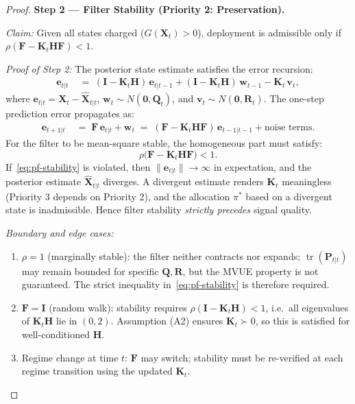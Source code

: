 \documentclass[12pt,openany]{book}
\numberwithin{equation}{chapter}
\theoremstyle{plain}
\theoremstyle{definition}
\theoremstyle{remark}
\DeclareMathOperator{\tr}{tr}
\def\mathcal#1{#1}%
\begin{document}
\begin{proof}
\medskip
\noindent\textbf{Step 2 — Filter Stability (Priority 2: Preservation).}

\noindent\textit{Claim:} Given all states charged
($G(\mathbf{X}_t) > 0$), deployment is admissible only if
$\rho(\mathbf{F} - \mathbf{K}_t\mathbf{H}\mathbf{F}) < 1$.

\noindent\textit{Proof of Step 2:}
The posterior state estimate satisfies the error recursion:
\begin{align}
  \mathbf{e}_{t|t}
  &\;=\; (\mathbf{I} - \mathbf{K}_t\mathbf{H})\,\mathbf{e}_{t|t-1}
         + (\mathbf{I} - \mathbf{K}_t\mathbf{H})\,\mathbf{w}_{t-1}
         - \mathbf{K}_t\,\mathbf{v}_t,
  \label{eq:pf-error-recursion}
\end{align}
where $\mathbf{e}_{t|t} = \mathbf{X}_t - \hat{\mathbf{X}}_{t|t}$,
$\mathbf{w}_t \sim \mathcal{N}(\mathbf{0}, \mathbf{Q}_t)$,
and $\mathbf{v}_t \sim \mathcal{N}(\mathbf{0}, \mathbf{R}_t)$.
The one-step prediction error propagates as:
\begin{align}
  \mathbf{e}_{t+1|t}
  &\;=\; \mathbf{F}\,\mathbf{e}_{t|t} + \mathbf{w}_t
  \;=\; (\mathbf{F} - \mathbf{K}_t\mathbf{H}\mathbf{F})\,
        \mathbf{e}_{t-1|t-1}
        + \text{noise terms}.
  \label{eq:pf-pred-error}
\end{align}
For the filter to be mean-square stable, the homogeneous part
must satisfy:
\begin{equation}
  \rho\!\bigl(\mathbf{F} - \mathbf{K}_t\mathbf{H}\mathbf{F}\bigr) < 1.
  \label{eq:pf-stability}
\end{equation}
If~\eqref{eq:pf-stability} is violated, then
$\|\mathbf{e}_{t|t}\| \to \infty$ in expectation, and the
posterior estimate $\hat{\mathbf{X}}_{t|t}$ diverges.  A
divergent estimate renders $\mathbf{K}_t$ meaningless (Priority
3 depends on Priority 2), and the allocation $\pi^*$ based on
a divergent state is inadmissible.  Hence filter stability
\emph{strictly precedes} signal quality.

\noindent\textit{Boundary and edge cases:}
\begin{enumerate}
  \item $\rho = 1$ (marginally stable): the filter neither
        contracts nor expands; $\tr(\mathbf{P}_{t|t})$ may
        remain bounded for specific $\mathbf{Q},\mathbf{R}$,
        but the MVUE property is not guaranteed.  The strict
        inequality in~\eqref{eq:pf-stability} is therefore
        required.
  \item $\mathbf{F} = \mathbf{I}$ (random walk): stability
        requires $\rho(\mathbf{I} - \mathbf{K}_t\mathbf{H}) < 1$,
        i.e.\ all eigenvalues of $\mathbf{K}_t\mathbf{H}$ lie
        in $(0,2)$.  Assumption (A2) ensures
        $\mathbf{K}_t \succ 0$, so this is satisfied for
        well-conditioned $\mathbf{H}$.
  \item Regime change at time $t$: $\mathbf{F}$ may switch;
        stability must be re-verified at each regime transition
        using the updated $\mathbf{K}_t$.
\end{enumerate}


\end{proof}
\end{document}
